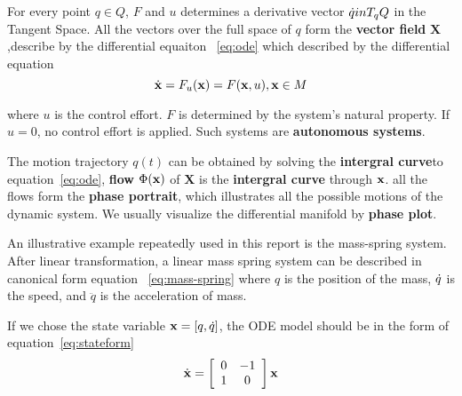 For every point $q \in Q$, 
$F$ and $u$ determines a derivative vector $\dot{q} in T_{q}Q$ in the Tangent Space. 
All the vectors over the full space of $q$ form the \textbf{vector field} $\mathbf{X}$,describe by the differential equaiton~ \ref{eq:ode}
which described by the differential equation
\begin{equation}
\label{eq:ode}
\dot{\mathbf{x}}=F_{u}(\mathbf{x})=F(\mathbf{x},u),\mathbf{x}\in M
\end{equation}

where $u$ is the control effort. 
$F$ is determined by the system's natural property.
If $u=0$,  no control effort is applied.
Such systems are \textbf{autonomous systems}. 

The motion trajectory $q(t)$ can be obtained by solving the \textbf{intergral curve}to equation~\ref{eq:ode}, 
\textbf{flow} $\Phi(\mathbf{x})$ of $\mathbf{X}$ is the \textbf{intergral curve} through $\mathbf{x}$. 
all the flows form the \textbf{phase portrait}, which illustrates all the possible motions of the dynamic system.
We usually visualize the differential manifold by \textbf{phase plot}.


An illustrative example repeatedly used in this report is the mass-spring system. 
After linear transformation,  
a linear mass spring system can be described in canonical form equation ~\ref{eq:mass-spring}
where $q$ is the position of the mass, $\dot{q}$ is the speed, and $\ddot{q}$ is the acceleration of mass.
 
If we chose the state variable $\mathbf{x}=[q,\dot{q}]$, the ODE model should be in the form of equation~\ref{eq:stateform}
\begin{equation}
\label{eq:stateform}
\dot{\mathbf{x}}=
\left[ 
\begin{array}{cc}
0 &-1\\
1 &0 
\end{array}
\right]\mathbf{x}
\end{equation}



